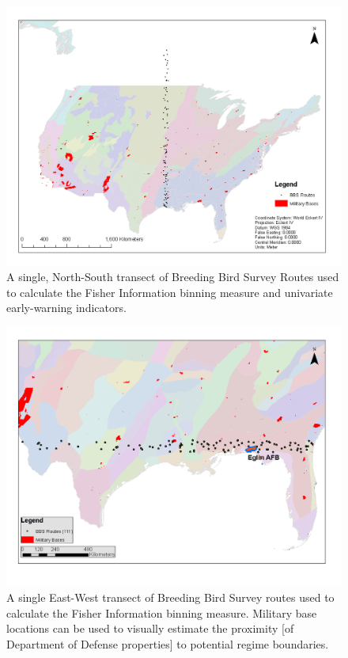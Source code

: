 \documentclass[12pt,twoside]{reedthesis}
\begin{document}
\begin{figure}

{\centering \includegraphics{chapterFiles/binningChap/figures/nsRouteMap} 

}

\caption{A single, North-South transect of Breeding Bird Survey Routes used to calculate the Fisher Information binning measure and univariate early-warning indicators. }\label{fig:nsRouteMap}
\end{figure}\begin{figure}
{\centering \includegraphics{chapterFiles/binningChap/figures/ewRouteMap} 

}

\caption{A single East-West transect of Breeding Bird Survey routes used to calculate the Fisher Information binning measure. Military base locations can be used to visually estimate the proximity [of Department of Defense properties] to potential regime boundaries.}\label{fig:ewRouteMap}
\end{figure}
\end{document}
